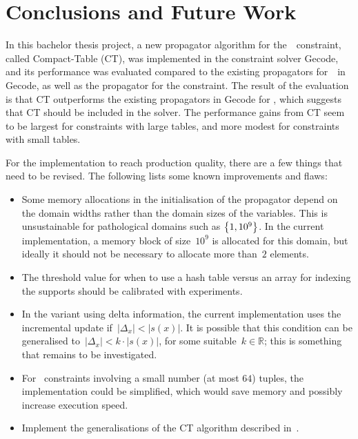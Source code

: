 \documentclass[a4paper,11pt]{article}
\newcommand{\Table}{\Constraint{Table}}
\numberwithin{equation}{section}
\begin{document}
\section{Conclusions and Future Work}
\label{conclusions}

In this bachelor thesis project, a new propagator algorithm for the~\Table~constraint,
called Compact-Table (CT), was implemented in the constraint solver Gecode, and its performance
was evaluated compared to the existing propagators for~\Table~in Gecode, as well
as the propagator for the  constraint.
The result of the evaluation is that CT outperforms the existing propagators
in Gecode for \Table, which suggests that CT should be included in the solver.
The performance gains from CT seem to be largest for constraints with large tables,
and more modest for constraints with small tables.

For the implementation to reach production quality, there
are a few things that need to be revised. The following lists some known
improvements and flaws:

\begin{itemize}
    
  \item Some memory allocations in the initialisation of the propagator
    depend on the domain widths rather
    than the domain sizes of the variables. This is unsustainable
    for pathological domains such as $\left\{1, 10^9\right\}$. In the current
    implementation, a memory block of size~$10^9$ is allocated for this
    domain, but ideally it should not be necessary to allocate more than~$2$
    elements.

  \item The threshold value for when to use a hash table versus
    an array for indexing the supports should be calibrated with
    experiments.

  \item In the variant using delta information, the current implementation
    uses the incremental update if~$|\Delta_x| < |s(x)|$. It is possible
    that this condition can be generalised to~$|\Delta_x| < k \cdot |s(x)|$,
    for some suitable~$k \in \mathbb{R}$; this is something that remains 
    to be investigated.
    
  \item For \Table~constraints involving a small number (at most $64$)
    tuples, the implementation could be simplified, which would save
    memory and possibly increase execution speed.

  \item Implement the generalisations of the CT algorithm described
    in~\cite{DBLP:conf/aaai/VerhaegheLS17}.

\end{itemize}
\end{document}
